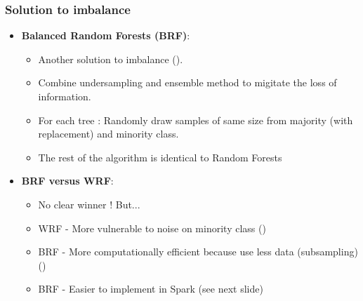 \documentclass[slidestop,compress,red,mathserif]{beamer}
\begin{document}
\begin{frame}
\frametitle{Solution to imbalance}
\begin{itemize}
  \item[] \textbf{Balanced Random Forests (BRF)}:
    \begin{itemize}
      \item Another solution to imbalance (\cite{Chen2004}).
      \item Combine undersampling and ensemble method to migitate the loss of information.
      \item For each tree : Randomly draw samples of same size from majority (with replacement) and minority class.
      \item The rest of the algorithm is identical to Random Forests
    \end{itemize}

  \item[] \textbf{BRF versus WRF}:
    \begin{itemize}
      \item No clear winner ! But...
      \item WRF - More vulnerable to noise on minority class (\cite{Chen2004})
      \item BRF - More computationally efficient because use less data (subsampling) (\cite{Chen2004})
      \item BRF - Easier to implement in Spark (see next slide)
    \end{itemize}

\end{itemize}
\end{frame}
\end{document}
